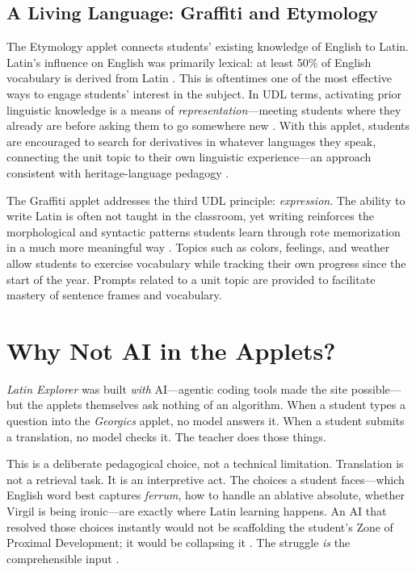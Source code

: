 \documentclass[11pt, a4paper]{article}
\begin{document}
\subsection{A Living Language: Graffiti and Etymology}

The Etymology applet connects students' existing knowledge of English to
Latin. Latin's influence on English was primarily lexical: at least 50\% of
English vocabulary is derived from Latin \autocite{Ostler2007}. This is
oftentimes one of the most effective ways to engage students' interest in
the subject. In UDL terms, activating prior linguistic knowledge is a means
of \textit{representation}---meeting students where they already are before
asking them to go somewhere new \autocite{CAST2018}. With this applet,
students are encouraged to search for derivatives in whatever languages they
speak, connecting the unit topic to their own linguistic
experience---an approach consistent with heritage-language pedagogy
\autocite{Polinsky2018}.

The Graffiti applet addresses the third UDL principle: \textit{expression}.
The ability to write Latin is often not taught in the classroom, yet
writing reinforces the morphological and syntactic patterns students learn
through rote memorization in a much more meaningful way
\autocite{SharwoodSmith1993}. Topics such as colors, feelings, and weather
allow students to exercise vocabulary while tracking their own progress
since the start of the year. Prompts related to a unit topic are provided
to facilitate mastery of sentence frames and vocabulary.

\section{Why Not AI in the Applets?}

\textit{Latin Explorer} was built \textit{with} AI---agentic coding tools
made the site possible---but the applets themselves ask nothing of an
algorithm. When a student types a question into the \textit{Georgics}
applet, no model answers it. When a student submits a translation, no model
checks it. The teacher does those things.

This is a deliberate pedagogical choice, not a technical limitation.
Translation is not a retrieval task. It is an interpretive act. The choices
a student faces---which English word best captures \textit{ferrum}, how to
handle an ablative absolute, whether Virgil is being ironic---are exactly
where Latin learning happens. An AI that resolved those choices instantly
would not be scaffolding the student's Zone of Proximal Development; it
would be collapsing it \autocite{Vygotsky1978}. The struggle \textit{is}
the comprehensible input \autocite{Krashen1982}.
\end{document}
